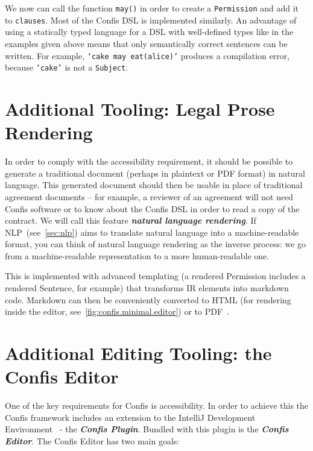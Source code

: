 We now can call the function \texttt{may()} in order to create a \texttt{Permission} and add it to \texttt{clauses}.
Most of the Confis DSL is implemented similarly.
An advantage of using a statically typed language for a DSL with well-defined types like in the examples given above means that only semantically correct sentences can be written.
For example, \texttt{`cake may eat(alice)'} produces a compilation error, because \texttt{`cake'} is not a \texttt{Subject}.




\section{Additional Tooling: Legal Prose Rendering}\label{sec:additional-tooling:doc-rendering}

In order to comply with the accessibility requirement, it should be possible to generate a traditional document (perhaps in plaintext or PDF format) in natural language.
This generated document should then be usable in place of traditional agreement documents -- for example, a reviewer of an agreement will not need Confis software or to know about the Confis DSL in order to read a copy of the contract.
We will call this feature \textbf{\emph{natural language rendering}}.
If NLP~(see~\autoref{sec:nlp}) aims to translate natural language into a machine-readable format, you can think of natural language rendering as the inverse process: we go from a machine-readable representation to a more human-readable one.

This is implemented with advanced templating (a rendered Permission includes a rendered Sentence, for example) that transforms IR elements into markdown code.
Markdown can then be conveniently converted to HTML (for rendering inside the editor, see~\autoref{fig:confis.minimal.editor}) or to PDF~\cite{pdf2020spec}.


\section[The Confis Editor]{Additional Editing Tooling: the Confis Editor}\label{sec:confis-editor}

One of the key requirements for Confis is accessibility.
In order to achieve this the Confis framework includes an extension to the IntelliJ Development Environment~\cite{intelliJRepo} - the \textbf{\emph{Confis Plugin}}.
Bundled with this plugin is the \textbf{\emph{Confis Editor}}.
The Confis Editor has two main goals:

